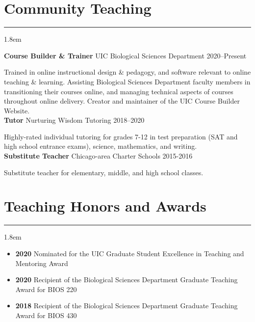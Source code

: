 \documentclass[]{article}
\begin{document}
\clearpage
\pagestyle{alldocument}

\section{Community Teaching}
\hrule
\vspace{4mm}
\leftskip 1.8em

\textbf{Course Builder \& Trainer} UIC Biological Sciences Department \hfill 2020--Present
     
Trained in online instructional design \& pedagogy, and software relevant to online teaching \& \linebreak learning. Assisting Biological Sciences Department faculty members in transitioning their courses online, and managing technical aspects of courses throughout online delivery. Creator and maintainer of the UIC Course Builder Website. \href{https://www.ledelaney.org/cb-materials}{\faLink} \href{https://github.com/ledelaney/cb-materials}{\faGithub}\\
     
\textbf{Tutor} Nurturing Wisdom Tutoring \hfill 2018--2020
     
Highly-rated individual tutoring for grades 7-12 in test preparation (SAT and high school entrance \linebreak exams), science, mathematics, and writing.\\

\textbf{Substitute Teacher} Chicago-area Charter Schools \hfill 2015-2016
     
Substitute teacher for elementary, middle, and high school classes.

\section{Teaching Honors and Awards}
\hrule
\vspace{4mm}
\leftskip 1.8em

\begin{itemize}[label=$\mathwitch*$]
\item{\textbf{2020} Nominated for the UIC Graduate Student Excellence in Teaching and Mentoring Award}
\item{\textbf{2020} Recipient of the Biological Sciences Department Graduate Teaching Award for BIOS 220}
\item{\textbf{2018} Recipient of the Biological Sciences Department Graduate Teaching Award for BIOS 430}
\end{itemize}
\end{document}
